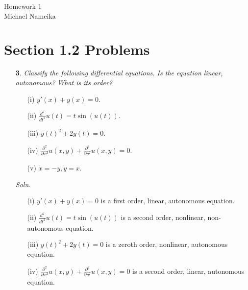 \documentclass{article}
\begin{document}
\fancyfoot{}
\fancyhead[R]{\thepage}

\pagestyle{firstpage}

\begin{center}
    \vspace{0.5cm}
    {\Huge Homework 1}\\
    \vspace{0.5cm}
    {\large Michael Nameika}
\end{center}

\section*{Section 1.2 Problems}
\begin{itemize}
    \item[\textbf{3}.]\textit{Classify the following differential equations. Is the equation linear, autonomous? What is its order?}
    \begin{itemize}
        \item[(i)] $y'(x) + y(x) = 0$.


        \item[(ii)] $\frac{d^2}{dt^2}u(t) = t\sin(u(t))$.



        \item[(iii)] $y(t)^2 + 2y(t) = 0$.


        \item[(iv)] $\frac{\partial^2}{\partial x^2}u(x,y) + \frac{\partial^2}{\partial y^2}u(x,y) = 0$.


        \item[(v)] $\dot{x} = -y, \dot{y} = x$.
    \end{itemize}

    \textit{Soln.}
    \begin{itemize}
        \item[(i)] $y'(x) + y(x) = 0$ is a first order, linear, autonomous equation.

        \item[(ii)] $\frac{d^2}{dt^2}u(t) = t\sin(u(t))$ is a second order, nonlinear, non-autonomous equation.

        \item[(iii)] $y(t)^2 + 2y(t) = 0$ is a zeroth order, nonlinear, autonomous equation.

        \item[(iv)] $\frac{\partial^2}{\partial x^2}u(x,y) + \frac{\partial^2}{\partial y^2}u(x,y) = 0$ is a second order, linear, autonomous equation.


\end{itemize}
\end{itemize}
\end{document}
